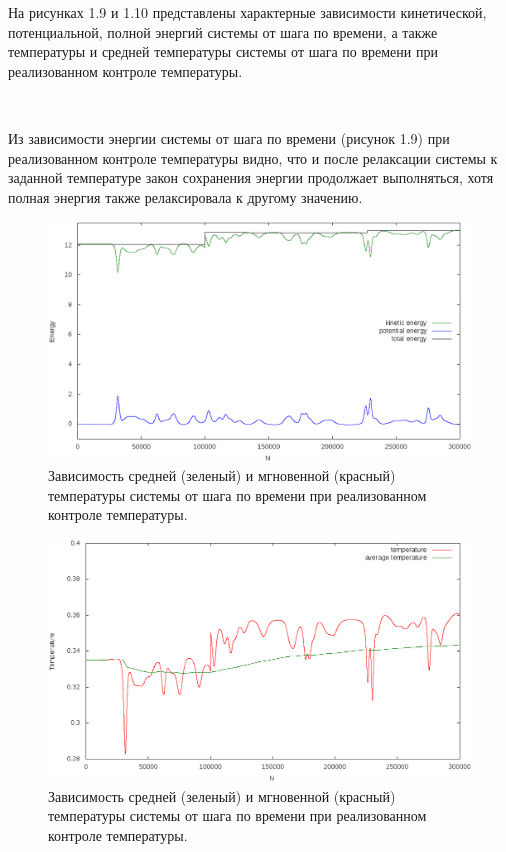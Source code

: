 \documentclass[14pt,a4paper,report]{ncc}
\begin{document}
На рисунках 1.9 и 1.10 представлены характерные зависимости кинетической, потенциальной, полной энергий системы от шага по времени, а также температуры и средней температуры системы от шага по времени при реализованном контроле температуры.

\

Из зависимости энергии системы от шага по времени (рисунок 1.9) при реализованном контроле температуры видно, что и после релаксации системы к заданной температуре закон сохранения энергии продолжает выполняться, хотя полная энергия также релаксировала к другому значению.

\begin{figure}[!h]
\includegraphics[scale=0.6]{energy300}
\caption{Зависимость средней (зеленый) и мгновенной (красный) температуры системы от шага по времени при реализованном контроле температуры.}
\end{figure}
\begin{figure}[!h]
\includegraphics[scale=0.6]{temp300}
\caption{Зависимость средней (зеленый) и мгновенной (красный) температуры системы от шага по времени при реализованном контроле температуры.}
\end{figure}
\
\end{document}
